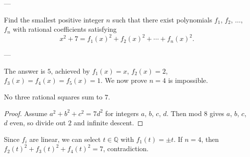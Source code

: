 
---

Find the smallest positive integer $n$ such that there exist polynomials $f_1$, $f_2$, $\ldots$, $f_n$ with rational coefficients satisfying \[x^2+7=f_1(x)^2+f_2(x)^2+\cdots+f_n(x)^2.\]

---

The answer is $5$, achieved by $f_1(x)=x$, $f_2(x)=2$, $f_3(x)=f_4(x)=f_5(x)=1$. We now prove $n=4$ is impossible.
\begin{iclaim*}
    No three rational squares sum to $7$.
\end{iclaim*}
\begin{proof}
    Assume $a^2+b^2+c^2=7d^2$ for integers $a$, $b$, $c$, $d$. Then mod $8$ gives $a$, $b$, $c$, $d$ even, so divide out $2$ and infinite descent.
\end{proof}

Since $f_i$ are linear, we can select $t\in\mathbb Q$ with $f_1(t)=\pm t$. If $n=4$, then $f_2(t)^2+f_3(t)^2+f_4(t)^2=7$, contradiction.
